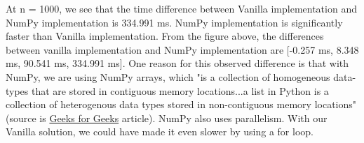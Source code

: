 \documentclass{article}
\begin{document}
\begin{aprob}
\begin{enumerate}
        At n = 1000, we see that the time difference between Vanilla implementation and NumPy implementation is 334.991 ms. NumPy implementation is significantly faster than Vanilla implementation. From the figure above, the differences between vanilla implementation and NumPy implementation are [-0.257 ms, 8.348 ms, 90.541 ms, 334.991 ms]. One reason for this observed difference is that with NumPy, we are using NumPy arrays, which "is a collection of homogeneous data-types that are stored in contiguous memory locations...a list in Python is a collection of heterogenous data types stored in non-contiguous memory locations" (source is \href{https://www.geeksforgeeks.org/}{Geeks for Geeks} article). NumPy also uses parallelism. With our Vanilla solution, we could have made it even slower by using a for loop.
        
    \end{enumerate}
\end{aprob}
\noindent\makebox[\linewidth]{\rule{\textwidth}{0.4pt}}
\end{document}
